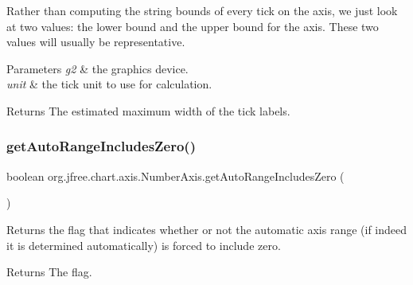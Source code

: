 Rather than computing the string bounds of every tick on the axis, we just look at two values\+: the lower bound and the upper bound for the axis. These two values will usually be representative.


\begin{DoxyParams}{Parameters}
{\em g2} & the graphics device. \\
\hline
{\em unit} & the tick unit to use for calculation.\\
\hline
\end{DoxyParams}
\begin{DoxyReturn}{Returns}
The estimated maximum width of the tick labels. 
\end{DoxyReturn}
\mbox{\label{classorg_1_1jfree_1_1chart_1_1axis_1_1_number_axis_a503dd4fb3ddf5fc3a1379e3bcec78d27}} 
\subsubsection{\texorpdfstring{get\+Auto\+Range\+Includes\+Zero()}{getAutoRangeIncludesZero()}}
{\footnotesize\ttfamily boolean org.\+jfree.\+chart.\+axis.\+Number\+Axis.\+get\+Auto\+Range\+Includes\+Zero (\begin{DoxyParamCaption}{ }\end{DoxyParamCaption})}

Returns the flag that indicates whether or not the automatic axis range (if indeed it is determined automatically) is forced to include zero.

\begin{DoxyReturn}{Returns}
The flag. 
\end{DoxyReturn}
\mbox{\label{classorg_1_1jfree_1_1chart_1_1axis_1_1_number_axis_a9562391142ac5e377c87a8a10614c092}} 
